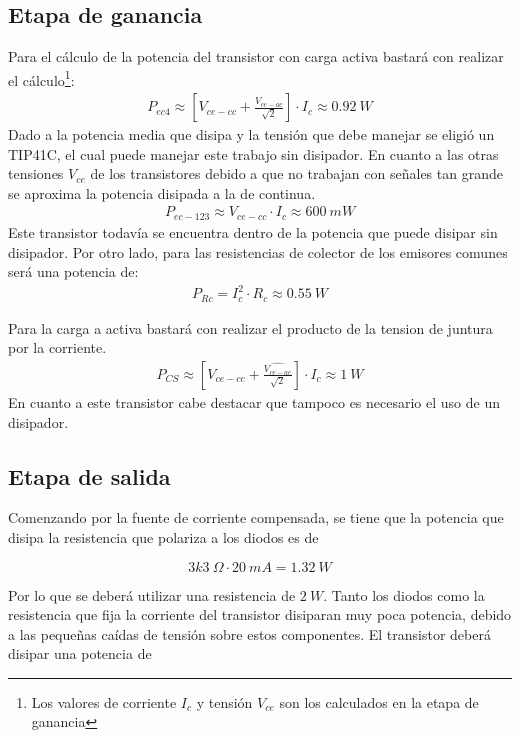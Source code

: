 \subsection{Etapa de ganancia}
Para el cálculo de la potencia del transistor con carga activa bastará con realizar el cálculo\footnote{Los valores de corriente $I_c$ y tensión $V_{ce}$ son los calculados en la etapa de ganancia}:
\begin{align}
P_{ec4}\approx\left[V_{ce-cc} + \frac{\hat{V_{ce-ac}}}{\sqrt{2}}\right]\cdot I_c\approx 0.92 \ W
\end{align}
Dado a la potencia media que disipa y la tensión que debe manejar se eligió un TIP41C, el cual puede manejar este trabajo sin disipador.
En cuanto a las otras tensiones $V_{ce}$ de los transistores debido a que no trabajan con señales tan grande se aproxima la potencia disipada a la de continua.
\begin{align}
P_{ec-123}\approx V_{ce-cc} \cdot I_c \approx 600 \ mW
\end{align}
Este transistor todavía se encuentra dentro de la potencia que puede disipar sin disipador.
Por otro lado, para las resistencias de colector de los emisores comunes será una potencia de:
\begin{align}
P_{Rc}= I_c^2 \cdot R_c \approx 0.55 \ W
\end{align}

Para la carga a activa bastará con realizar el producto de la tension de juntura por la corriente.
\begin{align}
P_{CS}\approx\left[V_{ce-cc} + \frac{\hat{V_{ce-ac}}}{\sqrt{2}}\right]\cdot I_c\approx  1 \ W
\end{align}
En cuanto a este transistor cabe destacar que tampoco es necesario el uso de un disipador.
\subsection{Etapa de salida}

Comenzando por la fuente de corriente compensada, se tiene que la potencia que disipa la resistencia que polariza a los diodos es de

\begin{equation}
3k3 \ \Omega \cdot 20 \ mA = 1.32 \ W
\end{equation}

Por lo que se deberá utilizar una resistencia de $2 \ W$. Tanto los diodos como la resistencia que fija la corriente del transistor disiparan muy poca potencia, debido a las pequeñas caídas de tensión sobre estos componentes. El transistor deberá disipar una potencia de

